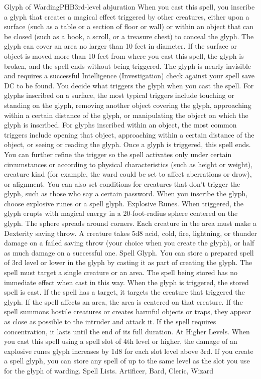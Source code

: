 \begin{spell}{Glyph of Warding}{PHB}{3rd-level abjuration}
{
}
When you cast this spell, you inscribe a glyph that creates a magical effect triggered by other creatures, either upon a surface (such as a table or a section of floor or wall) or within an object that can be closed (such as a book, a scroll, or a treasure chest) to conceal the glyph. The glyph can cover an area no larger than 10 feet in diameter. If the surface or object is moved more than 10 feet from where you cast this spell, the glyph is broken, and the spell ends without being triggered.
The glyph is nearly invisible and requires a successful Intelligence (Investigation) check against your spell save DC to be found.
You decide what triggers the glyph when you cast the spell. For glyphs inscribed on a surface, the most typical triggers include touching or standing on the glyph, removing another object covering the glyph, approaching within a certain distance of the glyph, or manipulating the object on which the glyph is inscribed. For glyphs inscribed within an object, the most common triggers include opening that object, approaching within a certain distance of the object, or seeing or reading the glyph. Once a glyph is triggered, this spell ends.
You can further refine the trigger so the spell activates only under certain circumstances or according to physical characteristics (such as height or weight), creature kind (for example, the ward could be set to affect aberrations or drow), or alignment. You can also set conditions for creatures that don’t trigger the glyph, such as those who say a certain password.
When you inscribe the glyph, choose explosive runes or a spell glyph.
Explosive Runes. When triggered, the glyph erupts with magical energy in a 20-foot-radius sphere centered on the glyph. The sphere spreads around corners. Each creature in the area must make a Dexterity saving throw. A creature takes 5d8 acid, cold, fire, lightning, or thunder damage on a failed saving throw (your choice when you create the glyph), or half as much damage on a successful one.
Spell Glyph. You can store a prepared spell of 3rd level or lower in the glyph by casting it as part of creating the glyph. The spell must target a single creature or an area. The spell being stored has no immediate effect when cast in this way. When the glyph is triggered, the stored spell is cast. If the spell has a target, it targets the creature that triggered the glyph. If the spell affects an area, the area is centered on that creature. If the spell summons hostile creatures or creates harmful objects or traps, they appear as close as possible to the intruder and attack it. If the spell requires concentration, it lasts until the end of its full duration.
At Higher Levels. When you cast this spell using a spell slot of 4th level or higher, the damage of an explosive runes glyph increases by 1d8 for each slot level above 3rd. If you create a spell glyph, you can store any spell of up to the same level as the slot you use for the glyph of warding.
Spell Lists. Artificer, Bard, Cleric, Wizard


\end{spell}
